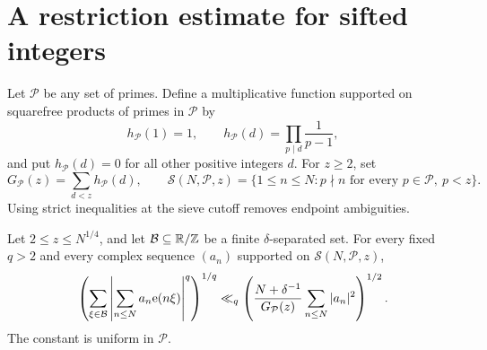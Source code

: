 \section{A restriction estimate for sifted integers}\label{sec:restriction}

Let \(\mathcal P\) be any set of primes. Define a multiplicative
function supported on squarefree products of primes in \(\mathcal P\)
by
\[
 h_{\mathcal P}(1)=1,\qquad
 h_{\mathcal P}(d)=\prod_{p\mid d}\frac1{p-1},
\]
and put \(h_{\mathcal P}(d)=0\) for all other positive integers \(d\).
For \(z\ge2\), set
\[
 G_{\mathcal P}(z)=\sum_{d<z}h_{\mathcal P}(d),\qquad
 \mathcal S(N,\mathcal P,z)=
 \{1\le n\le N:p\nmid n\text{ for every }p\in\mathcal P,\ p<z\}.
\]
Using strict inequalities at the sieve cutoff removes endpoint
ambiguities.

\begin{lemma}\label{lem:restriction}
Let \(2\le z\le N^{1/4}\), and let \(\mathcal B\subseteq\mathbb R/\mathbb Z\) be
a finite \(\delta\)-separated set. For every fixed \(q>2\) and every
complex sequence \((a_n)\) supported on
\(\mathcal S(N,\mathcal P,z)\),
\begin{equation}\label{eq:restriction}
 \left(\sum_{\xi\in\mathcal B}
   \left|\sum_{n\le N}a_n\mathrm e(n\xi)\right|^q\right)^{1/q}
 \ll_q
 \left(\frac{N+\delta^{-1}}{G_{\mathcal P}(z)}
             \sum_{n\le N}|a_n|^2\right)^{1/2}.
\end{equation}
The constant is uniform in \(\mathcal P\).
\end{lemma}


